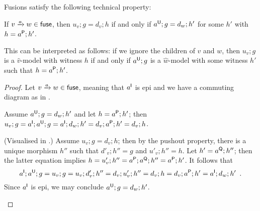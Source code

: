 Fusions satisfy the following technical property:
%
\begin{lemma}\label{lem:fusion}
If $\trip vaw\in\fuse$, then $u_v;g=d_v;h$ if and only if $a\U;g=d_w;h'$ for some $h'$ with $h=a\P;h'$.
\end{lemma}
%
This can be interpreted as follows: if we ignore the children of $v$ and $w$, then $u_v;g$ is a $\hat v$-model with witness $h$ if and only if $a\U;g$ is a $\hat w$-model with some witness $h'$ such that $h=a\P;h'$.
%
\begin{proof} Let $\trip vaw\in\fuse$, meaning that $a\I$ is epi and we have a commuting diagram as in .
\begin{description}[topsep=\itemsep]
\item[If.] Assume $a\U;g=d_w;h'$ and let $h=a\P;h'$; then $u_v;g=a\I;a\U;g=a\I;d_w;h'=d_v;a\P;h'=d_v;h$.
\item[Only if.] (Visualised in .) Assume $u_v;g=d_v;h$; then by the pushout property, there is a unique morphism $h''$ such that $d'_v;h''=g$ and $u'_v;h''=h$. Let $h'=a\Q;h''$; then the latter equation implies $h=u'_v;h''=a\P;a\Q;h''=a\P;h'$. It follows that
\[ a\I;a\U;g=u_v;g=u_v;d'_v;h''=d_v;u'_v;h''=d_v;h=d_v;a\P;h'=a\I;d_w;h' \enspace. \]
Since $a\I$ is epi, we may conclude $a\U;g=d_w;h'$.
\end{description}
\end{proof}


